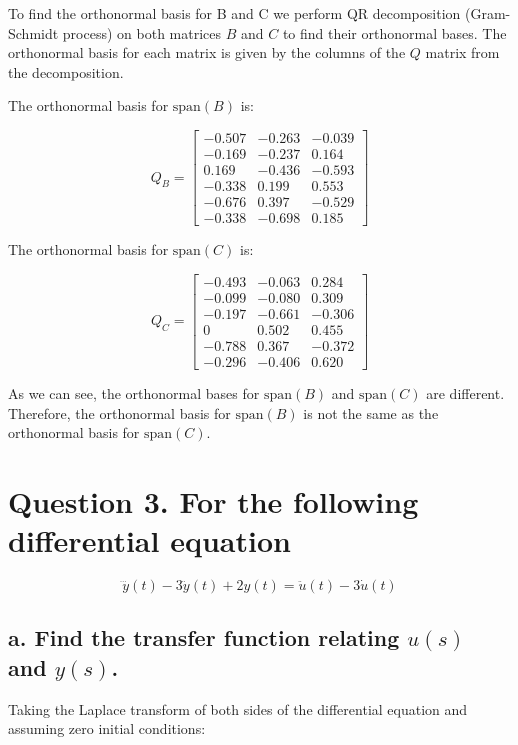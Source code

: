 \documentclass{article}
\begin{document}
To find the orthonormal basis for B and C we perform QR decomposition (Gram-Schmidt process) on both matrices \( B \) and \( C \) to find their orthonormal bases. The orthonormal basis for each matrix is given by the columns of the \( Q \) matrix from the decomposition.

The orthonormal basis for \( \text{span}(B) \) is:

\[
Q_B = \begin{bmatrix}
-0.507 & -0.263 & -0.039 \\
-0.169 & -0.237 & 0.164 \\
0.169 & -0.436 & -0.593 \\
-0.338 & 0.199 & 0.553 \\
-0.676 & 0.397 & -0.529 \\
-0.338 & -0.698 & 0.185
\end{bmatrix}
\]

The orthonormal basis for \( \text{span}(C) \) is:

\[
Q_C = \begin{bmatrix}
-0.493 & -0.063 & 0.284 \\
-0.099 & -0.080 & 0.309 \\
-0.197 & -0.661 & -0.306 \\
0 & 0.502 & 0.455 \\
-0.788 & 0.367 & -0.372 \\
-0.296 & -0.406 & 0.620
\end{bmatrix}
\]

As we can see, the orthonormal bases for \( \text{span}(B) \) and \( \text{span}(C) \) are different. Therefore, the orthonormal basis for \( \text{span}(B) \) is not the same as the orthonormal basis for \( \text{span}(C) \).

\section*{Question 3. For the following differential equation}

\[
\dddot{y}(t) - 3\ddot{y}(t) + 2y(t) = \ddot{u}(t) - 3\dot{u}(t)
\]

\subsection*{a. Find the transfer function relating \( u(s) \) and \( y(s) \).}

Taking the Laplace transform of both sides of the differential equation and assuming zero initial conditions:
\end{document}
